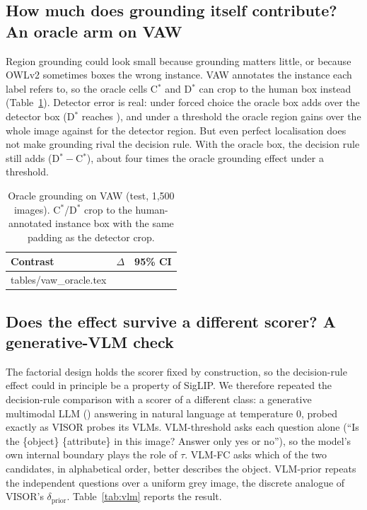 \documentclass[11pt]{article}
\makeatletter
\newcommand{\tabinput}[1]{\@@input #1 }
\makeatother
\begin{document}
\subsection{How much does grounding itself contribute? An oracle arm on VAW}\label{sec:oracle}
Region grounding could look small because grounding matters little, or because OWLv2 sometimes boxes the wrong instance. VAW annotates the instance each label refers to, so the oracle cells C$^{\ast}$ and D$^{\ast}$ can crop to the human box instead (Table~\ref{tab:oracle}). Detector error is real: under forced choice the oracle box adds \VAWtestDstarminusD{} \VAWtestDstarminusDCI{} over the detector box (D$^{\ast}$ reaches \VAWtestAccDstar), and under a threshold the oracle region gains \VAWtestCstarminusA{} over the whole image against \VAWtestCminusA{} for the detector region. But even perfect localisation does not make grounding rival the decision rule. With the oracle box, the decision rule still adds \VAWtestDstarminusCstar{} \VAWtestDstarminusCstarCI{} (D$^{\ast}-$C$^{\ast}$), about four times the oracle grounding effect under a threshold.

\begin{table}[!htbp]
\centering
\caption{Oracle grounding on VAW (test, 1{,}500 images). C$^{\ast}$/D$^{\ast}$ crop to the human-annotated instance box with the same padding as the detector crop.}
\label{tab:oracle}
\small
\begin{tabular}{lcc}
\toprule
Contrast & $\Delta$ & 95\% CI \\
\midrule
\tabinput{tables/vaw_oracle.tex}
\bottomrule
\end{tabular}
\end{table}

\subsection{Does the effect survive a different scorer? A generative-VLM check}\label{sec:vlm}
The factorial design holds the scorer fixed by construction, so the decision-rule effect could in principle be a property of SigLIP. We therefore repeated the decision-rule comparison with a scorer of a different class: a generative multimodal LLM (\texttt{\VLMmodel}) answering in natural language at temperature 0, probed exactly as VISOR probes its VLMs. VLM-threshold asks each question alone (``Is the \{object\} \{attribute\} in this image? Answer only yes or no''), so the model's own internal boundary plays the role of $\tau$. VLM-FC asks which of the two candidates, in alphabetical order, better describes the object. VLM-prior repeats the independent questions over a uniform grey image, the discrete analogue of VISOR's $\delta_{\mathrm{prior}}$. Table~\ref{tab:vlm} reports the result.
\end{document}
